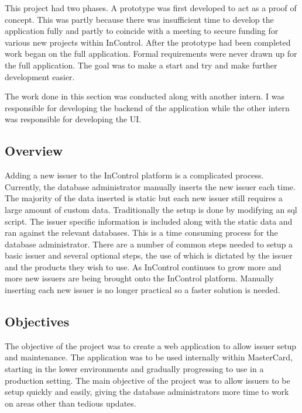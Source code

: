 \documentclass[a4paper, 11pt, titlepage]{article}
\begin{document}
This project had two phases. A prototype was first developed to act as a proof of concept. This was partly because there was insufficient time to develop the application fully and partly to coincide with a meeting to secure funding for various new projects within InControl. After the prototype had been completed work began on the full application. Formal requirements were never drawn up for the full application. The goal was to make a start and try and make further development easier.

The work done in this section was conducted along with another intern. I was responsible for developing the backend of the application while the other intern was responsible for developing the UI.


 
\subsection{Overview} 
Adding a new issuer to the InControl platform is a complicated process. Currently, the database administrator manually inserts the new issuer each time. The majority of the data inserted is static but each new issuer still requires a large amount of custom data. Traditionally the setup is done by modifying an sql script. The issuer specific information is included along with the static data and ran against the relevant databases. This is a time consuming process for the database administrator. There are a number of common steps needed to setup a basic issuer and several optional steps, the use of which is dictated by the issuer and the products they wish to use. As InControl continues to grow more and more new issuers are being brought onto the InControl platform. Manually inserting each new issuer is no longer practical so a faster solution is needed. 
 
  
 
\subsection{Objectives} 
 
The objective of the project was to create a web application to allow issuer setup and maintenance. The application was to be used internally within MasterCard, starting in the lower environments and gradually progressing to use in a production setting. The main objective of the project was to allow issuers to be setup quickly and easily, giving the database administrators more time to work on areas other than tedious updates. 
 
\end{document}
